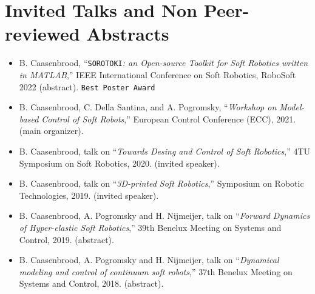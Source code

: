\section*{Invited Talks and Non Peer-reviewed Abstracts}
\begin{itemize}[leftmargin=4mm]
\item B. Caasenbrood, “\texttt{SOROTOKI}\textit{: an Open-source Toolkit for Soft Robotics written in MATLAB},”  IEEE International Conference on Soft Robotics, RoboSoft 2022 (abstract). \texttt{Best Poster Award}
\item B. Caasenbrood, C. Della Santina, and A. Pogromsky, “\textit{Workshop on Model-based Control of Soft Robots},” European Control Conference (ECC), 2021. (main organizer).
\item B. Caasenbrood, talk on  “\textit{Towards Desing and Control of Soft Robotics},” 4TU Symposium on Soft Robotics, 2020. (invited speaker).
\item B. Caasenbrood, talk on  “\textit{3D-printed Soft Robotics},” Symposium on Robotic Technologies, 2019. (invited speaker).
\item B. Caasenbrood, A. Pogromsky and H. Nijmeijer, talk on  “\textit{Forward Dynamics of Hyper-elastic Soft Robotics},” 39th Benelux Meeting on Systems and Control, 2019. (abstract).
\item B. Caasenbrood, A. Pogromsky and H. Nijmeijer, talk on  “\textit{Dynamical modeling and control of continuum soft robots},” 37th Benelux Meeting on Systems and Control, 2018. (abstract).
\end{itemize}


